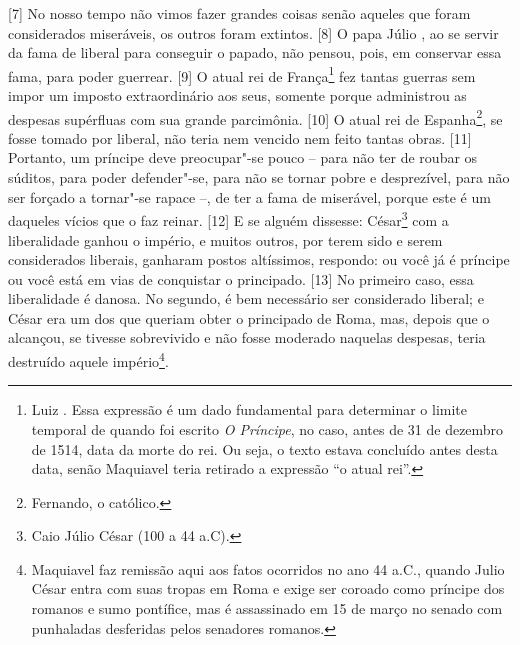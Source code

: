 {[}7{]} No nosso tempo não vimos fazer grandes coisas senão aqueles que
foram considerados miseráveis, os outros foram extintos. {[}8{]} O papa
Júlio , ao se servir da fama de liberal para conseguir o papado, não
pensou, pois, em conservar essa fama, para poder guerrear. {[}9{]} O
atual rei de França\footnote{Luiz . Essa expressão é um dado
  fundamental para determinar o limite temporal de quando foi escrito
  \emph{O Príncipe}, no caso, antes de 31 de dezembro de 1514, data da
  morte do rei. Ou seja, o texto estava concluído antes desta data,
  senão Maquiavel teria retirado a expressão ``o atual rei''.} fez
tantas guerras sem impor um imposto extraordinário aos seus, somente
porque administrou as despesas supérfluas com sua grande parcimônia.
{[}10{]} O atual rei de Espanha\footnote{Fernando, o católico.}, se
fosse tomado por liberal, não teria nem vencido nem feito tantas obras.
{[}11{]} Portanto, um príncipe deve preocupar"-se pouco -- para não ter
de roubar os súditos, para poder defender"-se, para não se tornar pobre e
desprezível, para não ser forçado a tornar"-se rapace --, de ter a fama
de miserável, porque este é um daqueles vícios que o faz reinar.
{[}12{]} E se alguém dissesse: César\footnote{Caio Júlio César (100 a 44
  a.C).} com a liberalidade ganhou o império, e muitos outros, por terem
sido e serem considerados liberais, ganharam postos altíssimos,
respondo: ou você já é príncipe ou você está em vias de conquistar o
principado. {[}13{]} No primeiro caso, essa liberalidade é danosa. No
segundo, é bem necessário ser considerado liberal; e César era um dos
que queriam obter o principado de Roma, mas, depois que o alcançou, se
tivesse sobrevivido e não fosse moderado naquelas despesas, teria
destruído aquele império\footnote{Maquiavel faz remissão aqui aos fatos
  ocorridos no ano 44 a.C., quando Julio César entra com suas tropas em
  Roma e exige ser coroado como príncipe dos romanos e sumo pontífice,
  mas é assassinado em 15 de março no senado com punhaladas desferidas
  pelos senadores romanos.}.

